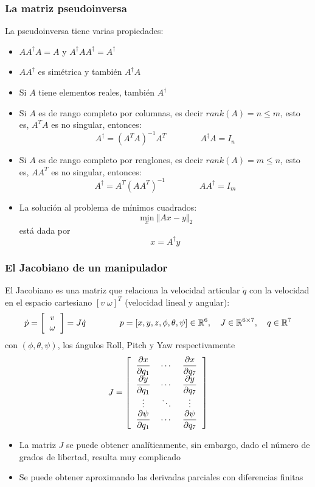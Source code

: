 \begin{frame}\frametitle{La matriz pseudoinversa}
  La pseudoinversa tiene varias propiedades:
  \begin{itemize}
  \item $AA^\dagger A = A$ y  $A^\dagger A A^\dagger = A^\dagger$
  \item $AA^\dagger$ es simétrica y también $A^\dagger A$
  \item Si $A$ tiene elementos reales, también $A^\dagger$
  \item Si $A$ es de rango completo por columnas, es decir $rank(A)=n\leq m$, esto es, $A^T A$ es no singular, entonces:
    \[A^\dagger = (A^T A)^{-1}A^T\qquad \qquad A^\dagger A = I_n\]
  \item Si $A$ es de rango completo por renglones, es decir $rank(A)=m\leq n$, esto es, $AA^T$ es no singular, entonces:
    \[A^\dagger = A^T(A A^T)^{-1}\qquad \qquad A A^\dagger = I_m\]
  \item La solución al problema de mínimos cuadrados:
    \[\min_x \left\Vert Ax - y \right\Vert_2 \]
      está dada por
      \[x = A^\dagger y\]
  \end{itemize}
\end{frame}

\begin{frame}\frametitle{El Jacobiano de un manipulador}
  El Jacobiano es una matriz que relaciona la velocidad articular $\dot{q}$ con la velocidad en el espacio cartesiano $[v\;\omega]^T$ (velocidad lineal y angular):
  \[\dot{p} = \left[\begin{tabular}{c}$v$\\$\omega$\end{tabular}\right] = J \dot{q}
  \qquad\qquad p =[x,y,z,\phi,\theta,\psi] \in \mathbb{R}^6, \quad J\in \mathbb{R}^{6\times 7},\quad q\in \mathbb{R}^7\]
  con $(\phi,\theta,\psi)$, los ángulos Roll, Pitch y Yaw respectivamente
  \[J = \left[ \begin{tabular}{ccc}
    $\dfrac{\partial x}{\partial q_1}$ & $\cdots$ & $\dfrac{\partial x}{\partial q_7}$\\
    $\dfrac{\partial y}{\partial q_1}$ & $\cdots$ & $\dfrac{\partial y}{\partial q_7}$\\
      $\vdots$ & $\ddots$ & $\vdots$ \\
      $\dfrac{\partial \psi}{\partial q_1}$ & $\cdots$ & $\dfrac{\partial \psi}{\partial q_7}$\\
    \end{tabular} \right]\]
\begin{itemize}
\item La matriz $J$ se puede obtener analíticamente, sin embargo, dado el número de grados de libertad, resulta muy complicado
\item Se puede obtener aproximando las derivadas parciales con diferencias finitas
\end{itemize}
\end{frame}

